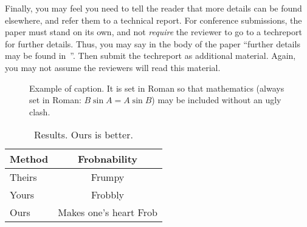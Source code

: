 \documentclass[10pt,twocolumn,letterpaper]{article}
\begin{document}
Finally, you may feel you need to tell the reader that more details can be
found elsewhere, and refer them to a technical report.  For conference
submissions, the paper must stand on its own, and not {\em require} the
reviewer to go to a techreport for further details.  Thus, you may say in
the body of the paper ``further details may be found
in~\cite{Authors14b}''.  Then submit the techreport as additional material.
Again, you may not assume the reviewers will read this material.

\begin{figure}[t]
\begin{center}
\fbox{\rule{0pt}{2in} \rule{0.9\linewidth}{0pt}}
\end{center}
   \caption{Example of caption.  It is set in Roman so that mathematics
   (always set in Roman: $B \sin A = A \sin B$) may be included without an
   ugly clash.}
\label{fig:long}
\label{fig:onecol}
\end{figure}

\begin{table}
\begin{center}
\begin{tabular}{|l|c|}
\hline
Method & Frobnability \\
\hline\hline
Theirs & Frumpy \\
Yours & Frobbly \\
Ours & Makes one's heart Frob\\
\hline
\end{tabular}
\end{center}
\caption{Results.   Ours is better.}
\end{table}

{\small


}
\end{document}
